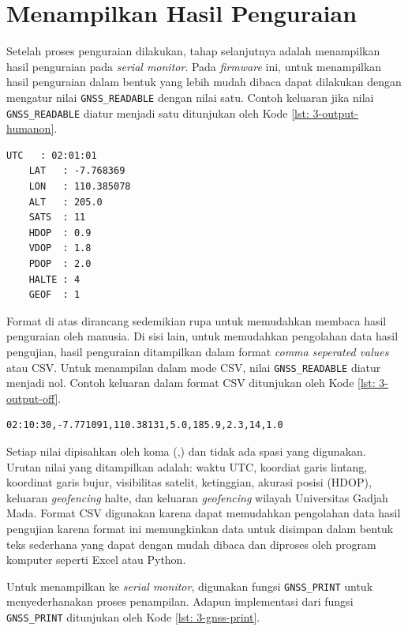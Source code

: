 \section{Menampilkan Hasil Penguraian}
Setelah proses penguraian dilakukan, tahap selanjutnya adalah menampilkan hasil penguraian pada \textit{serial monitor}. Pada \textit{firmware} ini, untuk menampilkan hasil penguraian dalam bentuk yang lebih mudah dibaca dapat dilakukan dengan mengatur nilai \texttt{GNSS\_READABLE} dengan nilai satu. Contoh keluaran jika nilai \texttt{GNSS\_READABLE} diatur menjadi satu ditunjukan oleh Kode \ref{lst: 3-output-humanon}.

\vspace{0.3cm}
\begin{lstlisting}[style=mystyle, caption={Contoh Keluaran jika Mode \texttt{GNSS\_READABLE} Diaktifkan}, label={lst: 3-output-humanon}]
	UTC   : 02:01:01
	LAT   : -7.768369
	LON   : 110.385078
	ALT   : 205.0
	SATS  : 11
	HDOP  : 0.9
	VDOP  : 1.8
	PDOP  : 2.0
	HALTE : 4
	GEOF  : 1
\end{lstlisting}

Format di atas dirancang sedemikian rupa untuk memudahkan membaca hasil penguraian oleh manusia. Di sisi lain, untuk memudahkan pengolahan data hasil pengujian, hasil penguraian ditampilkan dalam format \textit{comma seperated values} atau CSV. Untuk menampilan dalam mode CSV, nilai \texttt{GNSS\_READABLE} diatur menjadi nol. Contoh keluaran dalam format CSV ditunjukan oleh Kode \ref{lst: 3-output-off}.

\vspace{0.3cm}
\begin{lstlisting}[style=mystyle, caption={Contoh Keluaran jika Mode \texttt{GNSS\_READABLE} Tidak Diaktifkan}, label={lst: 3-output-off}]
02:10:30,-7.771091,110.38131,5.0,185.9,2.3,14,1.0
\end{lstlisting}

Setiap nilai dipisahkan oleh koma (,) dan tidak ada spasi yang digunakan. Urutan nilai yang ditampilkan adalah: waktu UTC, koordiat garis lintang, koordinat garis bujur, visibilitas satelit, ketinggian, akurasi posisi (HDOP), keluaran \textit{geofencing} halte, dan keluaran \textit{geofencing} wilayah Universitas Gadjah Mada. Format CSV digunakan karena dapat memudahkan pengolahan data hasil pengujian karena format ini memungkinkan data untuk disimpan dalam bentuk teks sederhana yang dapat dengan mudah dibaca dan diproses oleh program komputer seperti Excel atau Python.

Untuk menampilkan ke \textit{serial monitor}, digunakan fungsi \texttt{GNSS\_PRINT} untuk menyederhanakan proses penampilan. Adapun implementasi dari fungsi \texttt{GNSS\_PRINT} ditunjukan oleh Kode \ref{lst: 3-gnss-print}.

